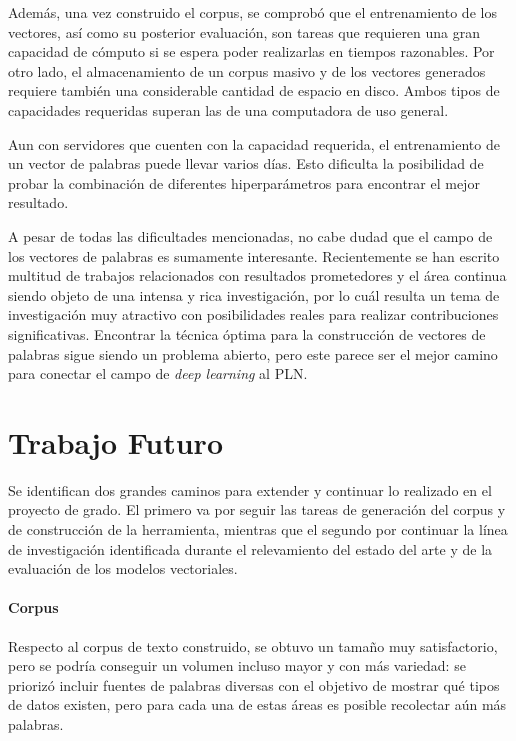 Además, una vez construido el corpus, se comprobó que el entrenamiento de los vectores, así como su
posterior evaluación, son tareas que requieren una gran capacidad de cómputo si se espera poder
realizarlas en tiempos razonables. Por otro lado, el almacenamiento de un corpus masivo y de los
vectores generados requiere también una considerable cantidad de espacio en disco. Ambos tipos de
capacidades requeridas superan las de una computadora de uso general.

Aun con servidores que cuenten con la capacidad requerida, el entrenamiento de un vector de palabras
puede llevar varios días. Esto dificulta la posibilidad de probar la combinación de diferentes
hiperparámetros para encontrar el mejor resultado.

A pesar de todas las dificultades mencionadas, no cabe dudad que el campo de los vectores de palabras
es sumamente interesante. Recientemente se han escrito multitud de trabajos relacionados con resultados
prometedores y el área continua siendo objeto de una intensa y rica investigación, por lo cuál resulta un
tema de investigación muy atractivo con posibilidades reales para realizar contribuciones significativas.
Encontrar la técnica óptima para la construcción de vectores de palabras sigue siendo un problema abierto,
pero este parece ser el mejor camino para conectar el campo de \textit{deep learning} al PLN.


\section{Trabajo Futuro}

Se identifican dos grandes caminos para extender y continuar lo realizado en el proyecto de
grado. El primero va por seguir las tareas de generación del corpus y de construcción de la
herramienta, mientras que el segundo por continuar la línea de investigación identificada durante el
relevamiento del estado del arte y de la evaluación de los modelos vectoriales.


\paragraph{Corpus}

Respecto al corpus de texto construido, se obtuvo un tamaño muy satisfactorio, pero se podría
conseguir un volumen incluso mayor y con más variedad: se priorizó incluir fuentes de palabras
diversas con el objetivo de mostrar qué tipos de datos existen, pero para cada una de estas áreas es
posible recolectar aún más palabras.

